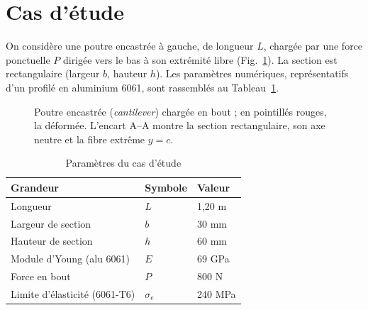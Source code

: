 \documentclass[10pt,journal]{IEEEtran}
\begin{document}
\section{Cas d'étude}
On considère une poutre encastrée à gauche, de longueur $L$, chargée par une force ponctuelle $P$ dirigée vers le bas à son extrémité libre (Fig.~\ref{fig:poutre}). La section est rectangulaire (largeur $b$, hauteur $h$). Les paramètres numériques, représentatifs d'un profilé en aluminium 6061, sont rassemblés au Tableau~\ref{tab:param}.

\begin{figure}[!t]
\centering
{}
\caption{Poutre encastrée (\emph{cantilever}) chargée en bout ; en pointillés rouges, la déformée. L'encart A--A montre la section rectangulaire, son axe neutre et la fibre extrême $y=c$.}
\label{fig:poutre}
\end{figure}

\begin{table}[!t]
\caption{Paramètres du cas d'étude}
\label{tab:param}
\centering
\begin{tabular}{@{}lll@{}}
\toprule
Grandeur & Symbole & Valeur \\
\midrule
Longueur & $L$ & 1,20 m \\
Largeur de section & $b$ & 30 mm \\
Hauteur de section & $h$ & 60 mm \\
Module d'Young (alu 6061) & $E$ & 69 GPa \\
Force en bout & $P$ & 800 N \\
Limite d'élasticité (6061-T6) & $\sigma_e$ & 240 MPa \\
\bottomrule
\end{tabular}
\end{table}
\end{document}
